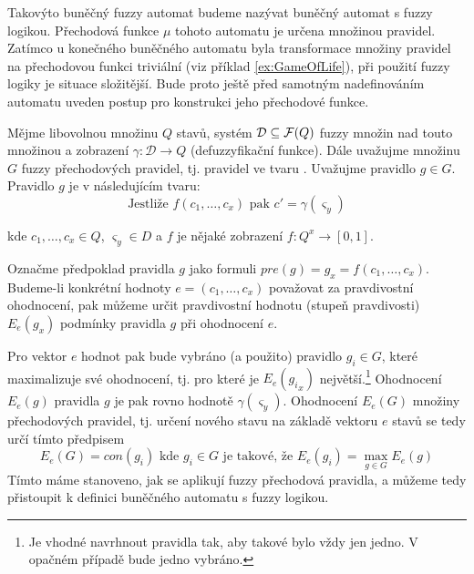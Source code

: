 \documentclass[a4paper,10pt]{article}
\begin{document}
Takovýto buněčný fuzzy automat budeme nazývat buněčný automat s fuzzy logikou. Přechodová funkce $\mu$ tohoto automatu je určena množinou   pravidel. Zatímco u konečného buněčného automatu byla transformace množiny pravidel na přechodovou funkci triviální (viz příklad \ref{ex:GameOfLife}), při použití fuzzy logiky je situace složitější. Bude proto ještě před samotným nadefinováním automatu uveden postup pro konstrukci jeho přechodové funkce.




Mějme libovolnou množinu $Q$ stavů, systém $\mathcal{D} \subseteq \mathcal{F}(Q)$ fuzzy množin nad touto množinou a zobrazení $\gamma: \mathcal{D} \rightarrow Q$ (defuzzyfikační funkce). Dále uvažujme množinu $G$ fuzzy přechodových pravidel, tj. pravidel ve tvaru . Uvažujme pravidlo $g \in G$. Pravidlo $g$ je v následujícím tvaru:
$$
  \text{Jestliže $f(c_1, \dots, c_x)$ pak $c' = \gamma(\varsigma_y)$}
$$

kde $c_1, \dots, c_x \in Q$, $\varsigma_y \in D$ a $f$ je nějaké zobrazení $f: Q^x \rightarrow [0,1]$.

Označme předpoklad pravidla $g$ jako formuli $pre(g) =  g_x = f(c_1, \dots, c_x)$. Budeme-li konkrétní hodnoty $e = (c_1, \dots, c_x)$ považovat za pravdivostní ohodnocení, pak můžeme určit pravdivostní hodnotu (stupeň pravdivosti) $E_e(g_x)$ podmínky pravidla $g$ při ohodnocení $e$.

Pro vektor $e$ hodnot pak bude vybráno (a použito) pravidlo $g_i \in G$, které maximalizuje své ohodnocení, tj. pro které je $E_e({g_i}_x)$ největší.\footnote{Je vhodné navrhnout pravidla tak, aby takové bylo vždy jen jedno. V opačném případě bude jedno vybráno.} Ohodnocení $E_e(g)$ pravidla $g$ je pak rovno hodnotě $\gamma(\varsigma_y)$. Ohodnocení $E_e(G)$ množiny přechodových pravidel, tj. určení nového stavu na základě vektoru $e$ stavů se tedy určí tímto předpisem
$$
  E_e(G) = con(g_i) \text{ kde $g_i \in G$ je takové, že $E_e(g_i) = \max_{g \in G} E_e(g)$}
$$
Tímto máme stanoveno, jak se aplikují fuzzy přechodová pravidla, a můžeme tedy přistoupit k definici buněčného automatu s fuzzy logikou.
\end{document}
